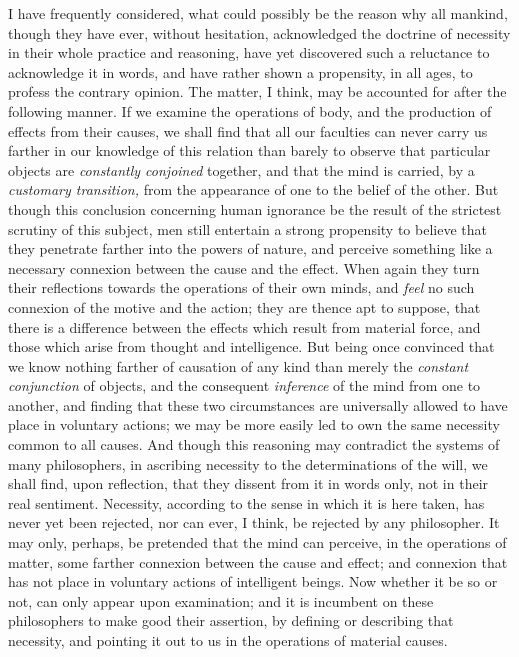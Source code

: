 \documentclass[]{article}
\begin{document}
\begin{sectionbody}
\humeparagraph  I have frequently considered, what could possibly be the reason why all mankind, though they have ever, without hesitation, acknowledged the doctrine of necessity in their whole practice and reasoning, have yet discovered such a reluctance to acknowledge it in words, and have rather shown a propensity, in all ages, to profess the contrary opinion. The matter, I think, may be accounted for after the following manner. If we examine the operations of body, and the production of effects from their causes, we shall find that all our faculties can never carry us farther in our knowledge of this relation than barely to observe that particular objects are \emph{constantly conjoined} together, and that the mind is carried, by a \emph{customary transition,} from the appearance of one to the belief of the other. But though this conclusion concerning human ignorance be the result of the strictest scrutiny of this subject, men still entertain a strong propensity to believe that they penetrate farther into the powers of nature, and perceive something like a necessary connexion between the cause and the effect. When again they turn their reflections towards the operations of their own minds, and \emph{feel} no such connexion of the motive and the action; they are thence apt to suppose, that there is a difference between the effects which result from material force, and those which arise from thought and intelligence. But being once convinced that we know nothing farther of causation of any kind than merely the \emph{constant conjunction} of objects, and the consequent \emph{inference} of the mind from one to another, and finding that these two circumstances are universally allowed to have place in voluntary actions; we may be more easily led to own the same necessity common to all causes. And though this reasoning may contradict the systems of many philosophers, in ascribing necessity to the determinations of the will, we shall find, upon reflection, that they dissent from it in words only, not in their real sentiment. Necessity, according to the sense in which it is here taken, has never yet been rejected, nor can ever, I think, be rejected by any philosopher. It may only, perhaps, be pretended that the mind can perceive, in the operations of matter, some farther connexion between the cause and effect; and connexion that has not place in voluntary actions of intelligent beings. Now whether it be so or not, can only appear upon examination; and it is incumbent on these philosophers to make good their assertion, by defining or describing that necessity, and pointing it out to us in the operations of material causes.


\end{sectionbody}
\end{document}
